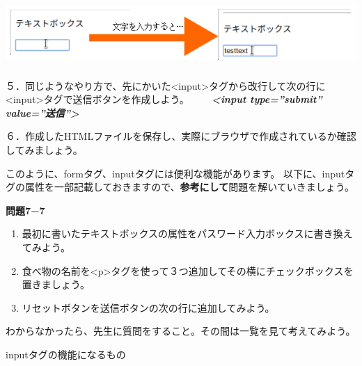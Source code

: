 \documentclass[a4paper,12pt,dvipdfmx]{jarticle}
\begin{document}
\centering
\includegraphics[width=16.3cm,height=2.54cm]{ome7-img037.png}
\flushleft

５．同じようなやり方で、先にかいた{\textless}input{\textgreater}タグから改行して次の行に{\textless}input{\textgreater}タグで送信ボタンを作成しよう。\newline
\ \ \ \ \textbf{\textit{{\textless}input type=”submit” value=”送信”{\textgreater}}}

６．作成したHTMLファイルを保存し、実際にブラウザで作成されているか確認してみましょう。\newline


このように、formタグ、inputタグには便利な機能があります。\newline
以下に、inputタグの属性を一部記載しておきますので、\textbf{参考にして}問題を解いていきましょう。


\bigskip

\clearpage
\textbf{問題7−7}\newline
\begin{enumerate}
	\item 最初に書いたテキストボックスの属性をパスワード入力ボックスに書き換えてみよう。
	\item 食べ物の名前を{\textless}p{\textgreater}タグを使って３つ追加してその横にチェックボックスを置きましょう。
	\item リセットボタンを送信ボタンの次の行に追加してみよう。
\end{enumerate}

\samepage

わからなかったら、先生に質問をすること。その間は一覧を見て考えてみよう。

inputタグの機能になるもの
\end{document}
